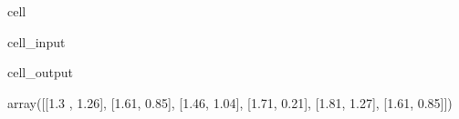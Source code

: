 \documentclass[letterpaper,10pt,english]{jupyterBook}
\begin{document}
\begin{sphinxuseclass}{cell}\begin{sphinxVerbatimInput}

\begin{sphinxuseclass}{cell_input}
\begin{sphinxVerbatim}[commandchars=\\\{\}]
  \PYG{p}{[}\PYG{p}{]}\PYG{p}{[}\PYG{p}{]}
\end{sphinxVerbatim}

\end{sphinxuseclass}\end{sphinxVerbatimInput}
\begin{sphinxVerbatimOutput}

\begin{sphinxuseclass}{cell_output}
\begin{sphinxVerbatim}[commandchars=\\\{\}]
array([[\PYGZhy{}1.3 ,  1.26],
       [\PYGZhy{}1.61, \PYGZhy{}0.85],
       [\PYGZhy{}1.46, \PYGZhy{}1.04],
       [\PYGZhy{}1.71,  0.21],
       [\PYGZhy{}1.81,  1.27],
       [\PYGZhy{}1.61, \PYGZhy{}0.85]])
\end{sphinxVerbatim}

\end{sphinxuseclass}\end{sphinxVerbatimOutput}

\end{sphinxuseclass}
\end{document}
